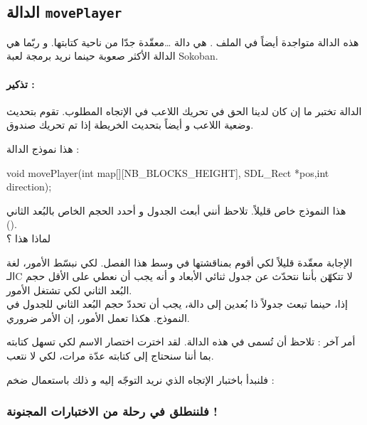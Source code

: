 \subsection{الدالة \texttt{movePlayer}}

هذه الدالة متواجدة أيضاً في الملف 
.
هي دالة \dots معقّدة جدّا من ناحية كتابتها. و ربّما هي الدالة الأكثر صعوبة حينما نريد برمجة لعبة
\textenglish{Sokoban}.

\paragraph{تذكير :}
الدالة
تختبر ما إن كان لدينا الحق في تحريك اللاعب في الإتجاه المطلوب. تقوم بتحديث وضعية اللاعب
و أيضاً بتحديث الخريطة إذا تم تحريك صندوق.

هذا نموذج الدالة :

\begin{Csource}
void movePlayer(int map[][NB_BLOCKS_HEIGHT], SDL_Rect *pos,int direction);
\end{Csource}

هذا النموذج خاص قليلاً. تلاحظ أنني أبعث الجدول
و أحدد الحجم الخاص بالبُعد الثاني\\
().\\
لماذا هذا ؟

الإجابة معقّدة قليلاً لكي أقوم بمناقشتها في وسط هذا الفصل. لكي نبسّط الأمور، لغة الـ\textenglish{C}
لا تتكهّن بأننا نتحدّث عن جدول ثنائي الأبعاد و أنه يجب أن نعطي على الأقل حجم البُعد الثاني لكي تشتغل الأمور.\\
إذا، حينما تبعث جدولاً ذا بُعدين إلى دالة، يجب أن تحددّ حجم البُعد الثاني للجدول في النموذج. هكذا تعمل الأمور، إن الأمر ضروري.

أمر آخر : تلاحظ أن
تُسمى 
في هذه الدالة. لقد اخترت اختصار الاسم لكي تسهل كتابته بما أننا سنحتاج إلى كتابته عدّة مرات، لكي لا نتعب.

فلنبدأ باختبار الإتجاه الذي نريد التوجّه إليه و ذلك باستعمال
ضخم :

\begin{Csource}
switch(direction)
{
	case UP:
	/* etc */
\end{Csource}

\subsubsection{فلننطلق في رحلة من الاختبارات المجنونة !}

